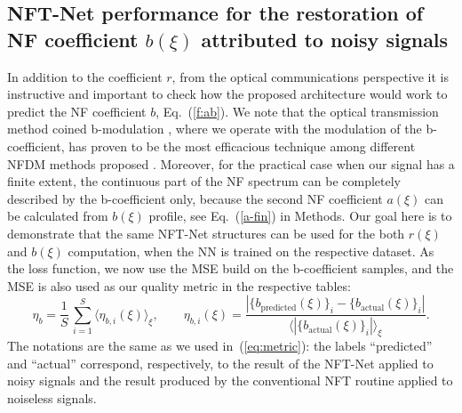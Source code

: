 \subsection*{NFT-Net performance for the restoration of NF coefficient $b(\xi)$ attributed to noisy signals}
In addition to the coefficient $r$, from the optical communications perspective it is instructive and important to check how the proposed architecture would work to predict the NF coefficient $b$, Eq.~(\ref{f:ab}). We note that the optical transmission method coined b-modulation \cite{w17,wsh20,svp20}, where we operate with the modulation of the b-coefficient, has proven to be the most efficacious technique among different NFDM methods proposed \cite{yal19,yla19}. Moreover, for the practical case when our signal has a finite extent, the continuous part of the NF spectrum can be completely described by the b-coefficient only, because the second NF coefficient $a(\xi)$ can be calculated from $b(\xi)$ profile, see Eq.~(\ref{a-fin}) in Methods. Our goal here is to demonstrate that the same NFT-Net structures can be used for the both $r(\xi)$ and $b(\xi)$ computation, when the NN is trained on the respective dataset. As the loss function, we now use the MSE build on the b-coefficient samples, and the MSE is also used as our quality metric in the respective tables:
\begin{equation}
    \eta_b = \frac{1}{S} \, \sum_{i = 1}^{S} \langle \eta_{b,i}(\xi) \rangle_{\xi}, 
    \qquad 
    \eta_{b,i}(\xi) = \frac{|\{b_\text{predicted}(\xi)\}_i - \{b_\text{actual}(\xi)\}_i| }{\langle |\{b_\text{actual}(\xi)\}_i| \rangle_{\xi}}.
    \label{eq:b_metric}
\end{equation}
The notations are the same as we used in~(\ref{eq:metric}): the labels ``predicted'' and ``actual'' correspond, respectively, to the result of the NFT-Net applied to noisy signals and the result produced by the conventional NFT routine applied to noiseless signals.

